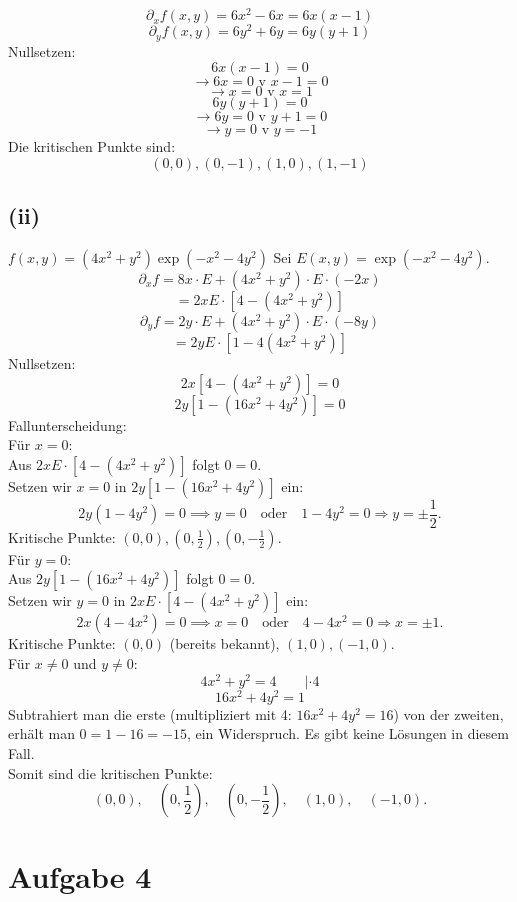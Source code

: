 \documentclass{article}
\begin{document}
\[\partial_x f(x,y) = 6x^2 - 6x = 6x(x-1) \]
\[\partial_y f(x,y) = 6y^2 + 6y = 6y(y+1) \]
Nullsetzen:
\[6x(x-1)=0\]
\[\rightarrow 6x=0 \text{ v }x-1=0\]
\[\rightarrow x=0 \text{ v } x=1\]
\newline 
\[6y(y+1)=0\]
\[\rightarrow 6y=0 \text{ v } y+1=0\]
\[\rightarrow y=0 \text{ v }y=-1\]
Die kritischen Punkte sind:
\[(0, 0), (0, -1),(1, 0),(1, -1)\]

\subsection*{(ii)}
$f(x,y) = (4x^2 + y^2) \exp(-x^2 - 4y^2)$
Sei $E(x,y) = \exp(-x^2 - 4y^2)$.
\[\partial_x f = 8x \cdot E + (4x^2 + y^2) \cdot E \cdot (-2x) \]
\[= 2x E \cdot [4 - (4x^2 + y^2)] \]
\[\partial_y f = 2y \cdot E + (4x^2 + y^2) \cdot E \cdot (-8y) \]
\[= 2y E \cdot [1 - 4(4x^2 + y^2)] \]
Nullsetzen:
\[2x [4 - (4x^2 + y^2)] = 0 \]
\[2y [1 - (16x^2 + 4y^2)] = 0 \]
Fallunterscheidung: \\
Für $x = 0$: \\
Aus $2x E \cdot [4 - (4x^2 + y^2)]$ folgt $0=0$. \\
Setzen wir $x=0$ in $2y [1 - (16x^2 + 4y^2)]$ ein:
\[2y (1 - 4y^2) = 0 \implies y = 0 \quad \text{oder} \quad 1 - 4y^2 = 0 \Rightarrow y = \pm \frac{1}{2}.\]
Kritische Punkte: $(0,0), (0, \frac{1}{2}), (0, -\frac{1}{2})$.\\
\newline
Für $y = 0$: \\
Aus $2y [1 - (16x^2 + 4y^2)]$ folgt $0=0$. \\ 
Setzen wir $y=0$ in $2x E \cdot [4 - (4x^2 + y^2)]$ ein:
\[2x (4 - 4x^2) = 0 \implies x = 0 \quad \text{oder} \quad 4 - 4x^2 = 0 \Rightarrow x = \pm 1.\]
Kritische Punkte: $(0,0)$ (bereits bekannt), $(1, 0), (-1, 0)$. \\
\newline
Für $x \neq 0$ und $y \neq 0$: 
\[4x^2 + y^2 = 4 \quad \quad |\cdot 4 \]
\[16x^2 + 4y^2 = 1 \]
Subtrahiert man die erste (multipliziert mit 4: $16x^2 + 4y^2 = 16$) von der zweiten, erhält man $0 = 1 - 16 = -15$, ein Widerspruch. Es gibt keine Lösungen in diesem Fall. \\
\newline
Somit sind die kritischen Punkte:
\[(0,0), \quad \left(0, \frac{1}{2}\right), \quad \left(0, -\frac{1}{2}\right), \quad (1, 0), \quad (-1, 0).\]

\section*{Aufgabe 4}
\end{document}

